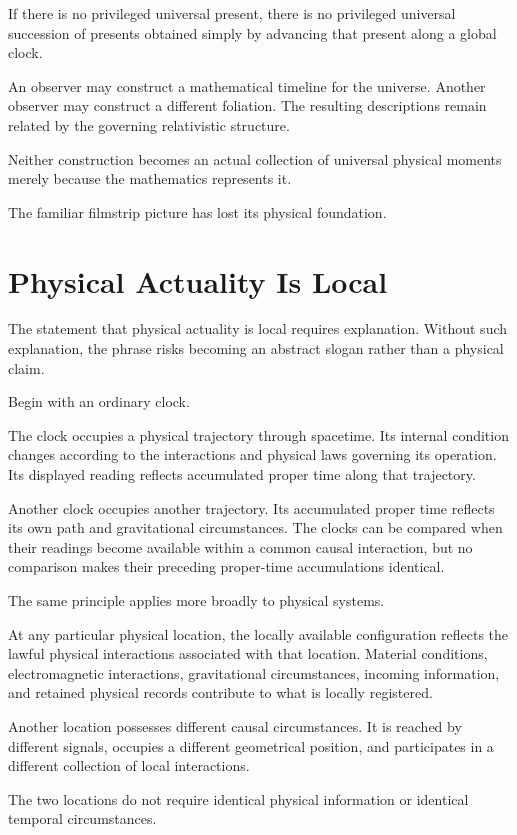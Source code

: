 \documentclass[12pt,onecolumn]{article}
\begin{document}
If there is no privileged universal present, there is no privileged universal succession of presents obtained simply by advancing that present along a global clock.

An observer may construct a mathematical timeline for the universe. Another observer may construct a different foliation. The resulting descriptions remain related by the governing relativistic structure.

Neither construction becomes an actual collection of universal physical moments merely because the mathematics represents it.

The familiar filmstrip picture has lost its physical foundation.

\section{Physical Actuality Is Local}

The statement that physical actuality is local requires explanation. Without such explanation, the phrase risks becoming an abstract slogan rather than a physical claim.

Begin with an ordinary clock.

The clock occupies a physical trajectory through spacetime. Its internal condition changes according to the interactions and physical laws governing its operation. Its displayed reading reflects accumulated proper time along that trajectory.

Another clock occupies another trajectory. Its accumulated proper time reflects its own path and gravitational circumstances. The clocks can be compared when their readings become available within a common causal interaction, but no comparison makes their preceding proper-time accumulations identical.

The same principle applies more broadly to physical systems.

At any particular physical location, the locally available configuration reflects the lawful physical interactions associated with that location. Material conditions, electromagnetic interactions, gravitational circumstances, incoming information, and retained physical records contribute to what is locally registered.

Another location possesses different causal circumstances. It is reached by different signals, occupies a different geometrical position, and participates in a different collection of local interactions.

The two locations do not require identical physical information or identical temporal circumstances.
\end{document}

